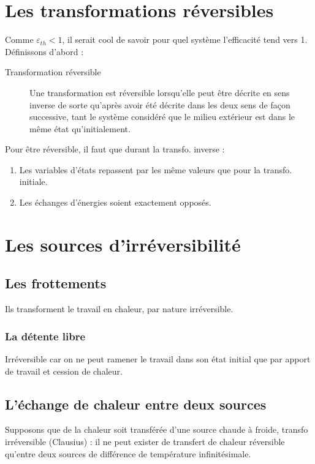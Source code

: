 	\section{Les transformations réversibles}
	Comme $\varepsilon_{th} < 1$, il serait cool de savoir pour quel système
	l'efficacité tend vers 1. Définissons d'abord :
	\begin{description}
	\item[Transformation réversible] Une transformation est 
	réversible lorsqu'elle peut être décrite en sens inverse de 
	sorte qu'après avoir été décrite dans les deux sens de façon 
	successive, tant le système considéré que le milieu extérieur 
	est dans le même état qu'initialement.
	\end{description}
	Pour être réversible, il faut que durant la transfo. inverse :
	\begin{enumerate}
	\item Les variables d'états repassent par les même valeurs que 
	pour la transfo. initiale.
	\item Les échanges d'énergies soient exactement opposés.
	\end{enumerate}
	
	
	\section{Les sources d'irréversibilité}
		\subsection{Les frottements}
		Ils transforment le travail en chaleur, par nature 
		irréversible.
		
		\subsubsection{La détente libre}
		Irréversible car on ne peut ramener le travail dans son 
		état initial que par apport de travail et cession de 
		chaleur.
		
		\subsection{L'échange de chaleur entre deux sources}
		Supposons que de la chaleur soit transférée d'une source 
		chaude à froide, transfo irréversible (Clausius) : il 
		ne peut exister de transfert de chaleur réversible qu'entre 
		deux sources de différence de température infinitésimale.
	
	

